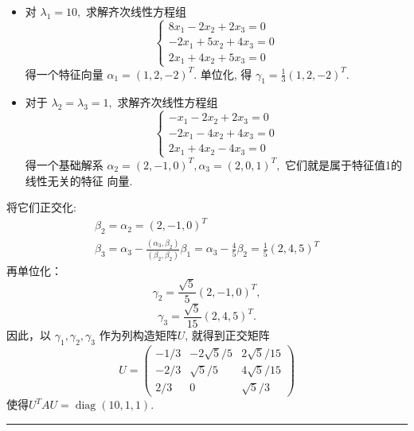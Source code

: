 \documentclass[13pt]{beamer}
\def\qed{\nopagebreak\hfill{\rule{4pt}{7pt}}\medbreak}
\begin{document}
\begin{frame}
\begin{itemize}
\item 
对 $\lambda_{1}=10,$ 求解齐次线性方程组
\[
\left\{\begin{array}{c}
8 x_{1}-2 x_{2}+2 x_{3}=0 \\
-2 x_{1}+5 x_{2}+4 x_{3}=0 \\
2 x_{1}+4 x_{2}+5 x_{3}=0
\end{array}\right.
\]
得一个特征向量 $\alpha_{1}=(1,2,-2)^{T}$. 
单位化, 得 $\gamma_{1}=\frac{1}{3}(1,2,-2)^{T}$.


\item 对于 $\lambda_{2}=\lambda_{3}=1,$ 求解齐次线性方程组
\[
\left\{\begin{array}{c}
-x_{1}-2 x_{2}+2 x_{3}=0 \\
-2 x_{1}-4 x_{2}+4 x_{3}=0 \\
2 x_{1}+4 x_{2}-4 x_{3}=0
\end{array}\right.
\]
得一个基础解系 $\alpha_{2}=(2,-1,0)^{T}, \alpha_{3}=(2,0,1)^{T},$ 它们就是属于特征值1的线性无关的特征
向量.
\end{itemize}
\end{frame}


\begin{frame}

将它们正交化:
\[
\begin{array}{l}
\beta_{2}=\alpha_{2}=(2,-1,0)^{T} \\
\beta_{3}=\alpha_{3}-\frac{\left(\alpha_{3}, \beta_{2}\right)}{\left(\beta_{2}, \beta_{2}\right)} \beta_{1}=\alpha_{3}-\frac{4}{5} \beta_{2}=\frac{1}{5}(2,4,5)^{T}
\end{array}
\]
再单位化：
\[
\gamma_{2}=\frac{\sqrt{5}}{5}(2,-1,0)^{T},
\]
\[
\gamma_{3}=\frac{\sqrt{5}}{15}(2,4,5)^{T}.
\]
因此，以 $\gamma_{1}, \gamma_{2}, \gamma_{3}$ 作为列构造矩阵$U$, 就得到正交矩阵
\[
U=\left(\begin{array}{ccc}
-1 / 3 & -2 \sqrt{5} / 5 & 2 \sqrt{5} / 15 \\
-2 / 3 & \sqrt{5} / 5 & 4 \sqrt{5} / 15 \\
2 / 3 & 0 & \sqrt{5} / 3
\end{array}\right)
\]
使得$U^T AU = \operatorname{diag}(10, 1, 1).$
\qed
\end{frame}
\end{document}

